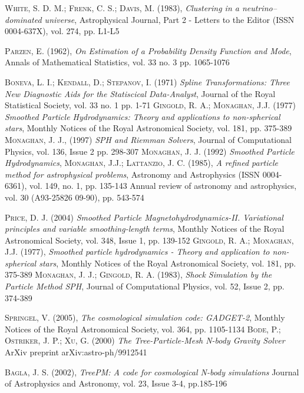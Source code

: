 \documentclass[a4paper,openright,10pt, oneside, final]{book}
\begin{document}
\begin{thebibliography}{a}
 \textsc{White, S. D. M.; Frenk, C. S.; Davis, M. (1983)},
\textit{Clustering in a neutrino--dominated universe},
Astrophysical Journal, Part 2 - Letters to the Editor (ISSN 0004-637X), vol. 274, pp. L1-L5

 \textsc{Parzen, E. (1962)},
\textit{On Estimation of a Probability Density Function and Mode},
Annals of Mathematical Statistics, vol. 33 no. 3 pp. 1065-1076

 \textsc{Boneva, L. I.; Kendall, D.; Stepanov, I. (1971)}
\textit{Spline Transformations: Three New Diagnostic Aids for the Statiscical Data-Analyst},
Journal of the Royal Statistical Society, vol. 33 no. 1 pp. 1-71
 \textsc{Gingold, R. A.; Monaghan, J.J. (1977)}
\textit{Smoothed Particle Hydrodynamics: Theory and applications to non-spherical stars},
Monthly Notices of the Royal Astronomical Society, vol. 181, pp. 375-389
 \textsc{Monaghan, J. J., (1997)}
\textit{SPH and Riemman Solvers},
Journal of Computational Physics, vol. 136, Issue 2 pp. 298-307 
 \textsc{Monaghan, J. J. (1992)}
\textit{Smoothed Particle Hydrodynamics},
 \textsc{Monaghan, J.J.; Lattanzio, J. C. (1985)},
\textit{A refined particle method for astrophysical problems},
Astronomy and Astrophysics (ISSN 0004-6361), vol. 149, no. 1, pp. 135-143
Annual review of astronomy and astrophysics, vol. 30 (A93-25826 09-90), pp. 543-574


 \textsc{Price, D. J. (2004)}
\textit{Smoothed Particle Magnetohydrodynamics-II. Variational principles and variable smoothing-length terms},
Monthly Notices of the Royal Astronomical Society, vol. 348, Issue 1, pp. 139-152
 \textsc{Gingold, R. A.; Monaghan, J.J. (1977)},
\textit{Smoothed particle hydrodynamics - Theory and application to non-spherical stars},
Monthly Notices of the Royal Astronomical Society, vol. 181, pp. 375-389
 \textsc{Monaghan, J. J.; Gingold, R. A. (1983)},
\textit{Shock Simulation by the Particle Method SPH},
Journal of Computational Physics, vol. 52, Issue 2, pp. 374-389

 \textsc{Springel, V. (2005)},
\textit{The cosmological simulation code: GADGET-2},
Monthly Notices of the Royal Astronomical Society, vol. 364, pp. 1105-1134
 \textsc{Bode, P.; Ostriker, J. P.; Xu, G. (2000)}
\textit{The Tree-Particle-Mesh N-body Gravity Solver}
ArXiv preprint arXiv:astro-ph/9912541 


 \textsc{Bagla, J. S. (2002)},
\textit{TreePM: A code for cosmological N-body simulations}
Journal of Astrophysics and Astronomy, vol. 23, Issue 3-4, pp.185-196


\end{thebibliography}
\end{document}
